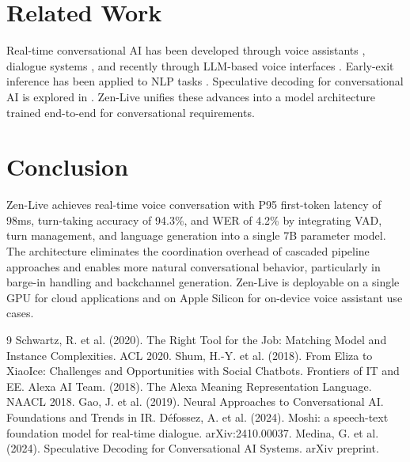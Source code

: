 \documentclass[11pt,a4paper]{article}
\begin{document}
\section{Related Work}

Real-time conversational AI has been developed through voice assistants \cite{siri,alexa}, dialogue systems \cite{dialog}, and recently through LLM-based voice interfaces \cite{voicellm}. Early-exit inference has been applied to NLP tasks \cite{earlyexit}. Speculative decoding for conversational AI is explored in \cite{spectalk}. Zen-Live unifies these advances into a model architecture trained end-to-end for conversational requirements.

\section{Conclusion}

Zen-Live achieves real-time voice conversation with P95 first-token latency of 98ms, turn-taking accuracy of 94.3\%, and WER of 4.2\% by integrating VAD, turn management, and language generation into a single 7B parameter model. The architecture eliminates the coordination overhead of cascaded pipeline approaches and enables more natural conversational behavior, particularly in barge-in handling and backchannel generation. Zen-Live is deployable on a single GPU for cloud applications and on Apple Silicon for on-device voice assistant use cases.

\begin{thebibliography}{9}
 Schwartz, R. et al. (2020). The Right Tool for the Job: Matching Model and Instance Complexities. ACL 2020.
 Shum, H.-Y. et al. (2018). From Eliza to XiaoIce: Challenges and Opportunities with Social Chatbots. Frontiers of IT and EE.
 Alexa AI Team. (2018). The Alexa Meaning Representation Language. NAACL 2018.
 Gao, J. et al. (2019). Neural Approaches to Conversational AI. Foundations and Trends in IR.
 Défossez, A. et al. (2024). Moshi: a speech-text foundation model for real-time dialogue. arXiv:2410.00037.
 Medina, G. et al. (2024). Speculative Decoding for Conversational AI Systems. arXiv preprint.
\end{thebibliography}
\end{document}
